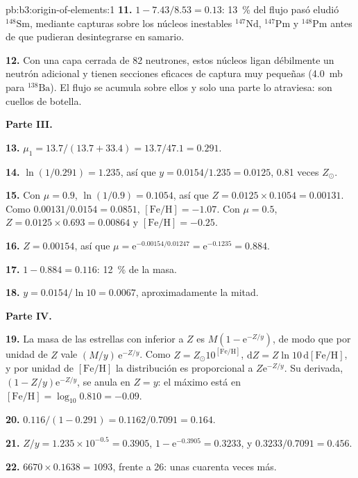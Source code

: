 \begin{solution}{pb:b3:origin-of-elements:1}
\textbf{11.} $1 - 7.43/8.53 = \num{0.13}$: \qty{13}{\percent} del flujo pasó
eludió $^{148}\mathrm{Sm}$, mediante capturas sobre los núcleos
inestables $^{147}\mathrm{Nd}$, $^{147}\mathrm{Pm}$ y $^{148}\mathrm{Pm}$ antes de
que pudieran desintegrarse en samario.

\textbf{12.} Con una capa cerrada de 82 neutrones, estos núcleos ligan
débilmente un neutrón adicional y tienen secciones eficaces de captura muy pequeñas (\qty{4.0}{mb}
para $^{138}\mathrm{Ba}$). El flujo se acumula sobre ellos y solo una parte
lo atraviesa: son cuellos de botella.

\textbf{Parte III.}

\textbf{13.} $\mu_1 = 13.7/(13.7 + 33.4) = 13.7/47.1 = \num{0.291}$.

\textbf{14.} $\ln(1/0.291) = \num{1.235}$, así que $y = 0.0154/1.235 = \num{0.0125}$,
\num{0.81} veces $Z_\odot$.

\textbf{15.} Con $\mu = 0.9$, $\ln(1/0.9) = 0.1054$, así que $Z = 0.0125\times0.1054 =
\num{0.00131}$. Como $0.00131/0.0154 = 0.0851$, $[\mathrm{Fe/H}] =
-1.07$. Con $\mu = 0.5$, $Z = 0.0125\times0.693 = \num{0.00864}$ y
$[\mathrm{Fe/H}] = -0.25$.

\textbf{16.} $Z = 0.00154$, así que $\mu = \mathrm{e}^{-0.00154/0.01247} =
\mathrm{e}^{-0.1235} = \num{0.884}$.

\textbf{17.} $1 - 0.884 = \num{0.116}$: \qty{12}{\percent} de la masa.

\textbf{18.} $y = 0.0154/\ln 10 = \num{0.0067}$, aproximadamente la mitad.

\textbf{Parte IV.}

\textbf{19.} La masa de las estrellas con  inferior a $Z$ es
$M(1 - \mathrm{e}^{-Z/y})$, de modo que por unidad de $Z$ vale
$(M/y)\,\mathrm{e}^{-Z/y}$. Como $Z = Z_\odot10^{[\mathrm{Fe/H}]}$,
$\mathrm{d}Z = Z\ln 10\,\mathrm{d}[\mathrm{Fe/H}]$, y por unidad de
$[\mathrm{Fe/H}]$ la distribución es proporcional a
$Z\mathrm{e}^{-Z/y}$. Su derivada,
$(1 - Z/y)\mathrm{e}^{-Z/y}$, se anula en $Z = y$: el máximo está en
$[\mathrm{Fe/H}] = \log_{10}0.810 = -0.09$.

\textbf{20.} $\num{0.116}/(1 - 0.291) = 0.1162/0.7091 = \num{0.164}$.

\textbf{21.} $Z/y = 1.235\times10^{-0.5} = 0.3905$, $1 - \mathrm{e}^{-0.3905} =
0.3233$, y $0.3233/0.7091 = \num{0.456}$.

\textbf{22.} $6670\times0.1638 = 1093$, frente a 26: unas cuarenta veces más.


\end{solution}
